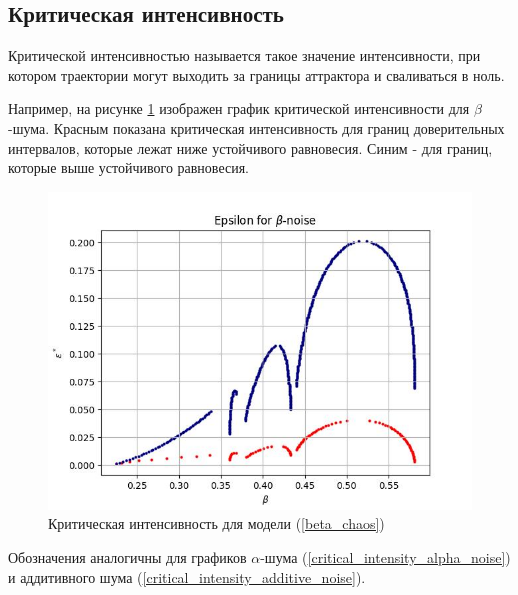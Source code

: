 \subsection{Критическая интенсивность}

    Критической интенсивностью называется такое значение интенсивности, при котором траектории могут выходить за границы аттрактора и сваливаться в ноль.

    Например, на рисунке \ref{critical_intensity_beta_noise} изображен график критической интенсивности для \(\beta\)-шума. Красным показана критическая интенсивность для границ доверительных интервалов, которые лежат ниже устойчивого равновесия. Синим - для границ, которые выше устойчивого равновесия. 



    \begin{figure}
        \centering
        \includegraphics[width=\textwidth]{stochastic/images/critical_intensity_beta_noise.jpg}
        
        \captionsetup{justification=centering}
        \caption{Критическая интенсивность для модели (\ref{beta_chaos})}
        \label{critical_intensity_beta_noise}
    \end{figure}
        
    Обозначения аналогичны для графиков \(\alpha\)-шума (\ref{critical_intensity_alpha_noise}) и аддитивного шума (\ref{critical_intensity_additive_noise}).

